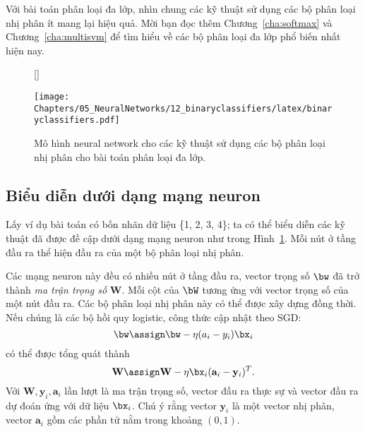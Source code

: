 Với bài toán phân loại đa lớp, nhìn chung các kỹ thuật sử dụng các bộ phân loại
nhị phân ít mang lại hiệu quả. Mời bạn đọc thêm
Chương~\ref{cha:softmax} và Chương~\ref{cha:multisvm} để tìm hiểu về các bộ phân
loại đa lớp phổ biến nhất hiện nay.

 
 
 
\begin{figure}[t]
    [\FBwidth]
    {\caption{ 
    Mô hình neural network cho các kỹ thuật sử dụng các bộ phân loại nhị phân
    cho bài toán phân loại đa lớp.
    }
    \label{fig:12_6}}
    { %
    \texttt{[image: Chapters/05\_NeuralNetworks/12\_binaryclassifiers/latex/binaryclassifiers.pdf]}
    }
\end{figure}
\subsection{Biểu diễn dưới dạng mạng neuron}
Lấy ví dụ bài toán có bốn nhãn dữ liệu \{1, 2, 3, 4\}; ta có thể biểu diễn các kỹ
thuật đã được đề cập dưới dạng mạng neuron như trong Hình~\ref{fig:12_6}. Mỗi nút ở tầng đầu ra thể hiện đầu ra của một bộ phân loại nhị phân.

Các mạng neuron này đều có nhiều nút ở tầng đầu ra, vector trọng số
$\bw$ đã trở thành \textit{ma trận trọng số} $\mathbf{W}$. Mỗi
cột của $\bW$ tương ứng với vector trọng số của một nút đầu ra. Các bộ phân loại nhị phân này có thể được xây dựng đồng thời. Nếu chúng là các bộ hồi quy logistic, công thức cập nhật theo SGD:
\begin{equation} 
\bw \assign \bw - \eta(a_i - y_i)\bx_i 
\end{equation} 
có thể được tổng quát thành
\begin{equation} 
\label{eqn:gen_sgd_log}
\mathbf{W} \assign \mathbf{W} - \eta\bx_i(\mathbf{a}_i - \mathbf{y}_i)^T.
\end{equation} 
 Với $\mathbf{W}, \mathbf{y}_i, \mathbf{a}_i$ lần lượt là ma trận trọng số,
vector đầu ra thực sự và vector đầu ra dự đoán ứng với dữ liệu $\bx_i$. Chú ý
rằng vector $\mathbf{y}_i$ là một vector nhị phân, vector $\mathbf{a}_i$ gồm các
phần tử nằm trong khoảng $(0, 1)$.


